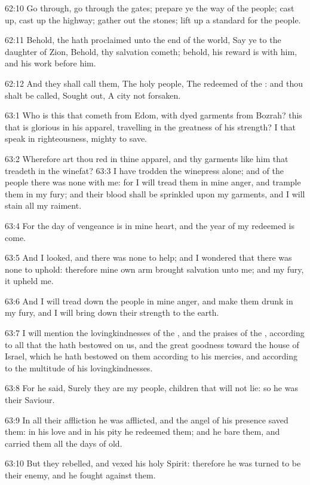 62:10 Go through, go through the gates; prepare ye the way of the people; cast up, cast up the highway; gather out the stones; lift up a standard for the people.

62:11 Behold, the \LORD hath proclaimed unto the end of the world, Say ye to the daughter of Zion, Behold, thy salvation cometh; behold, his reward is with him, and his work before him.

62:12 And they shall call them, The holy people, The redeemed of the \LORD: and thou shalt be called, Sought out, A city not forsaken.

63:1 Who is this that cometh from Edom, with dyed garments from Bozrah?  this that is glorious in his apparel, travelling in the greatness of his strength? I that speak in righteousness, mighty to save.

63:2 Wherefore art thou red in thine apparel, and thy garments like him that treadeth in the winefat?  63:3 I have trodden the winepress alone; and of the people there was none with me: for I will tread them in mine anger, and trample them in my fury; and their blood shall be sprinkled upon my garments, and I will stain all my raiment.

63:4 For the day of vengeance is in mine heart, and the year of my redeemed is come.

63:5 And I looked, and there was none to help; and I wondered that there was none to uphold: therefore mine own arm brought salvation unto me; and my fury, it upheld me.

63:6 And I will tread down the people in mine anger, and make them drunk in my fury, and I will bring down their strength to the earth.

63:7 I will mention the lovingkindnesses of the \LORD, and the praises of the \LORD, according to all that the \LORD hath bestowed on us, and the great goodness toward the house of Israel, which he hath bestowed on them according to his mercies, and according to the multitude of his lovingkindnesses.

63:8 For he said, Surely they are my people, children that will not lie: so he was their Saviour.

63:9 In all their affliction he was afflicted, and the angel of his presence saved them: in his love and in his pity he redeemed them; and he bare them, and carried them all the days of old.

63:10 But they rebelled, and vexed his holy Spirit: therefore he was turned to be their enemy, and he fought against them.

